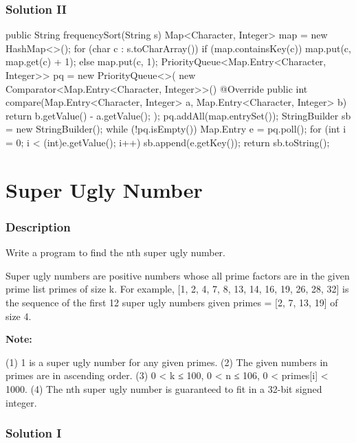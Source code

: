 \subsubsection{Solution II}

\begin{Code}
public String frequencySort(String s) {
    Map<Character, Integer> map = new HashMap<>();
    for (char c : s.toCharArray()) {
        if (map.containsKey(c)) {
            map.put(c, map.get(c) + 1);
        } else {
            map.put(c, 1);
        }
    }
    PriorityQueue<Map.Entry<Character, Integer>> pq = new PriorityQueue<>(
            new Comparator<Map.Entry<Character, Integer>>() {
                @Override
                public int compare(Map.Entry<Character, Integer> a, Map.Entry<Character, Integer> b) {
                    return b.getValue() - a.getValue();
                }
            }
    );
    pq.addAll(map.entrySet());
    StringBuilder sb = new StringBuilder();
    while (!pq.isEmpty()) {
        Map.Entry e = pq.poll();
        for (int i = 0; i < (int)e.getValue(); i++) {
            sb.append(e.getKey());
        }
    }
    return sb.toString();
}
\end{Code}

\newpage


\section{Super Ugly Number} %

\subsubsection{Description}
Write a program to find the nth super ugly number.

Super ugly numbers are positive numbers whose all prime factors are in the given prime list primes of size k. For example, [1, 2, 4, 7, 8, 13, 14, 16, 19, 26, 28, 32] is the sequence of the first 12 super ugly numbers given primes = [2, 7, 13, 19] of size 4.

\textbf{Note:}
\begin{Code}
(1) 1 is a super ugly number for any given primes.
(2) The given numbers in primes are in ascending order.
(3) 0 < k ≤ 100, 0 < n ≤ 106, 0 < primes[i] < 1000.
(4) The nth super ugly number is guaranteed to fit in a 32-bit signed integer.
\end{Code}

\subsubsection{Solution I}

